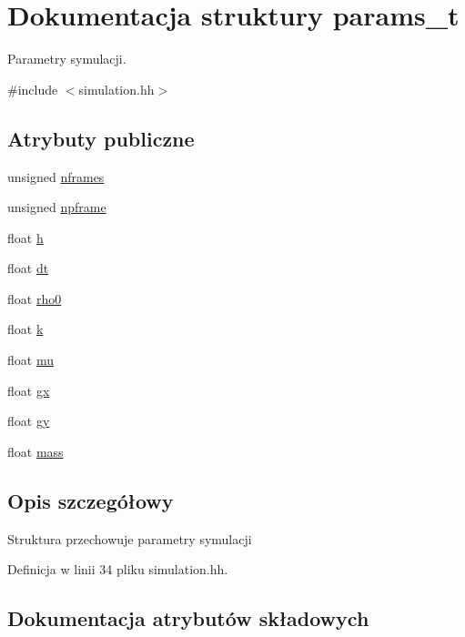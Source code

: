 \hypertarget{structparams__t}{}\section{Dokumentacja struktury params\+\_\+t}
\label{structparams__t}


Parametry symulacji.  




{\ttfamily \#include $<$simulation.\+hh$>$}

\subsection*{Atrybuty publiczne}
\begin{DoxyCompactItemize}
\item 
unsigned \hyperlink{structparams__t_a2cecc28f4ca024657cf567047e2aba59}{nframes}
\item 
unsigned \hyperlink{structparams__t_a06a1a567fd5ba13905514227e2bb710a}{npframe}
\item 
float \hyperlink{structparams__t_a27d76064f2ae0cb93a0956027cfcc19b}{h}
\item 
float \hyperlink{structparams__t_a81fc6596e9b1446442ebf3eef2c3fb01}{dt}
\item 
float \hyperlink{structparams__t_a2eb309edb681d0a998f23fc692a73781}{rho0}
\item 
float \hyperlink{structparams__t_a97ee2783cf89cee1151be3250e9054b3}{k}
\item 
float \hyperlink{structparams__t_a971359c29b2f946b477e4a1b3605fa3f}{mu}
\item 
float \hyperlink{structparams__t_a9f3f70c0cdedcb053c9d45c2e41e67b6}{gx}
\item 
float \hyperlink{structparams__t_a0da484b4cc6a542875aa7b92e200f507}{gy}
\item 
float \hyperlink{structparams__t_afe4a59fe43565a71a0a7a155714e2af1}{mass}
\end{DoxyCompactItemize}


\subsection{Opis szczegółowy}
Struktura przechowuje parametry symulacji 

Definicja w linii 34 pliku simulation.\+hh.



\subsection{Dokumentacja atrybutów składowych}
\hypertarget{structparams__t_a81fc6596e9b1446442ebf3eef2c3fb01}{}
